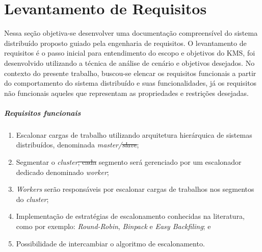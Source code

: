 \documentclass[
	12pt,				%
	openright,			%
	oneside,			%
	a4paper,			%
	brazil				%
	]{abntex2}
\providecommand{\DIFaddtex}[1]{{\protect\color{blue}\uwave{#1}}} %
\providecommand{\DIFdeltex}[1]{{\protect\color{red}\sout{#1}}}                      %
\providecommand{\DIFaddbegin}{} %
\providecommand{\DIFaddend}{} %
\providecommand{\DIFdelbegin}{} %
\providecommand{\DIFdelend}{} %
\providecommand{\DIFaddFL}[1]{\DIFadd{#1}} %
\providecommand{\DIFadd}[1]{\texorpdfstring{\DIFaddtex{#1}}{#1}} %
\providecommand{\DIFdel}[1]{\texorpdfstring{\DIFdeltex{#1}}{}} %
\newcommand{\DIFscaledelfig}{0.5}
\newlength{\DIFdelgraphicswidth} %
\newlength{\DIFdelgraphicsheight} %
\newcommand{\DIFaddincludegraphics}[2][]{{\color{blue}\fbox{\DIFOincludegraphics[#1]{#2}}}} %
\newcommand{\DIFdelincludegraphics}[2][]{%
\sbox{\DIFdelgraphicsbox}{\DIFOincludegraphics[#1]{#2}}%
\settoboxwidth{\DIFdelgraphicswidth}{\DIFdelgraphicsbox} %
\settoboxtotalheight{\DIFdelgraphicsheight}{\DIFdelgraphicsbox} %
\scalebox{\DIFscaledelfig}{%
\parbox[b]{\DIFdelgraphicswidth}{\usebox{\DIFdelgraphicsbox}\\[-\baselineskip] \rule{\DIFdelgraphicswidth}{0em}}\llap{\resizebox{\DIFdelgraphicswidth}{\DIFdelgraphicsheight}{%
\setlength{\unitlength}{\DIFdelgraphicswidth}%
\begin{picture}(1,1)%
\thicklines\linethickness{2pt} %
{\color[rgb]{1,0,0}\put(0,0){\framebox(1,1){}}}%
{\color[rgb]{1,0,0}\put(0,0){\line( 1,1){1}}}%
{\color[rgb]{1,0,0}\put(0,1){\line(1,-1){1}}}%
\end{picture}%
}\hspace*{3pt}}} %
} %
\DeclareRobustCommand{\DIFaddbegin}{\DIFOaddbegin \let\includegraphics\DIFaddincludegraphics} %
\DeclareRobustCommand{\DIFaddend}{\DIFOaddend \let\includegraphics\DIFOincludegraphics} %
\DeclareRobustCommand{\DIFdelbegin}{\DIFOdelbegin \let\includegraphics\DIFdelincludegraphics} %
\DeclareRobustCommand{\DIFdelend}{\DIFOaddend \let\includegraphics\DIFOincludegraphics} %
\begin{document}

\DIFaddend \section{Levantamento de Requisitos}

Nessa seção objetiva-se desenvolver uma documentação compreensível do sistema distribuído proposto guiado pela engenharia de requisitos. O levantamento de requisitos é o passo inicial para entendimento do escopo e objetivos do \ac{KMS}, foi desenvolvido utilizando a técnica de análise de cenário e objetivos desejados. No contexto do presente trabalho, buscou-se elencar os requisitos funcionais a partir do comportamento do sistema distribuído e suas funcionalidades, já os requisitos não funcionais aqueles que representam as propriedades e restrições desejadas. 

\subparagraph{Requisitos funcionais}
\begin{enumerate}
	\item Escalonar cargas de trabalho utilizando arquitetura hierárquica de sistemas distribuídos, denominada \textit{master/\DIFdelbegin \DIFdel{slave}\DIFdelend \DIFaddbegin \DIFadd{worker}\DIFaddend };
	\item Segmentar o \textit{cluster}\DIFdelbegin \DIFdel{, cada }\DIFdelend \DIFaddbegin \DIFadd{. Cada }\DIFaddend segmento será gerenciado por um escalonador dedicado denominado \textit{worker};
	\item \textit{Workers} serão responsáveis por escalonar cargas de trabalhos nos segmentos do \textit{cluster};
	\item Implementação de estratégias de escalonamento conhecidas na literatura, como por exemplo: \textit{Round-Robin}, \textit{Binpack} e \textit{Easy Backfiling}; e
	\item Possibilidade de intercambiar o algoritmo de escalonamento.
\end{enumerate}
\end{document}
